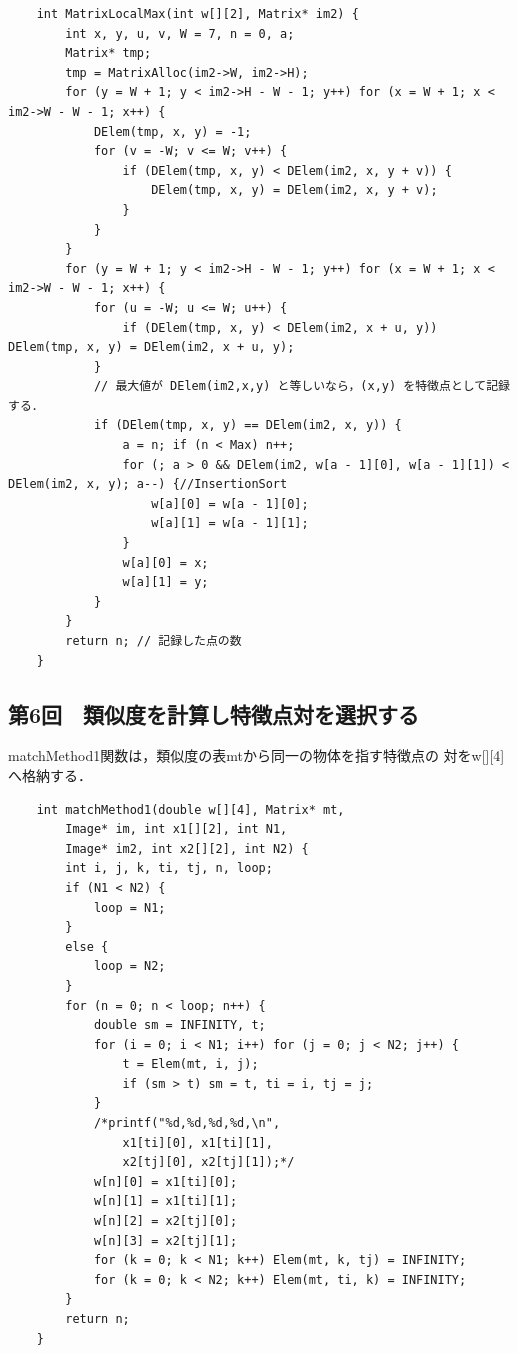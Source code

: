 \documentclass[11pt]{jarticle}
\begin{document}
\begin{lstlisting}
    int MatrixLocalMax(int w[][2], Matrix* im2) {
        int x, y, u, v, W = 7, n = 0, a;
        Matrix* tmp;
        tmp = MatrixAlloc(im2->W, im2->H);
        for (y = W + 1; y < im2->H - W - 1; y++) for (x = W + 1; x < im2->W - W - 1; x++) {
            DElem(tmp, x, y) = -1;
            for (v = -W; v <= W; v++) {
                if (DElem(tmp, x, y) < DElem(im2, x, y + v)) {
                    DElem(tmp, x, y) = DElem(im2, x, y + v);
                }
            }
        }
        for (y = W + 1; y < im2->H - W - 1; y++) for (x = W + 1; x < im2->W - W - 1; x++) {
            for (u = -W; u <= W; u++) {
                if (DElem(tmp, x, y) < DElem(im2, x + u, y)) DElem(tmp, x, y) = DElem(im2, x + u, y);
            }
            // 最大値が DElem(im2,x,y) と等しいなら，(x,y) を特徴点として記録する． 
            if (DElem(tmp, x, y) == DElem(im2, x, y)) {
                a = n; if (n < Max) n++;
                for (; a > 0 && DElem(im2, w[a - 1][0], w[a - 1][1]) < DElem(im2, x, y); a--) {//InsertionSort
                    w[a][0] = w[a - 1][0];
                    w[a][1] = w[a - 1][1];
                }
                w[a][0] = x;
                w[a][1] = y;
            }
        }
        return n; // 記録した点の数 
    }
\end{lstlisting}

\subsection{第6回　類似度を計算し特徴点対を選択する}

matchMethod1関数は，類似度の表mtから同一の物体を指す特徴点の
対をw[][4]へ格納する．

\begin{lstlisting}
    int matchMethod1(double w[][4], Matrix* mt,
        Image* im, int x1[][2], int N1,
        Image* im2, int x2[][2], int N2) {
        int i, j, k, ti, tj, n, loop;
        if (N1 < N2) {
            loop = N1;
        }
        else {
            loop = N2;
        }
        for (n = 0; n < loop; n++) {
            double sm = INFINITY, t;
            for (i = 0; i < N1; i++) for (j = 0; j < N2; j++) {
                t = Elem(mt, i, j);
                if (sm > t) sm = t, ti = i, tj = j;
            }
            /*printf("%d,%d,%d,%d,\n",
                x1[ti][0], x1[ti][1],
                x2[tj][0], x2[tj][1]);*/
            w[n][0] = x1[ti][0];
            w[n][1] = x1[ti][1];
            w[n][2] = x2[tj][0];
            w[n][3] = x2[tj][1];
            for (k = 0; k < N1; k++) Elem(mt, k, tj) = INFINITY;
            for (k = 0; k < N2; k++) Elem(mt, ti, k) = INFINITY;
        }
        return n;
    }
\end{lstlisting}
\end{document}
